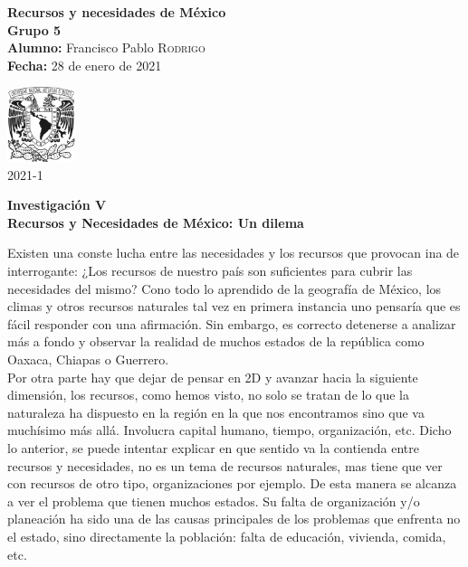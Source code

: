 \documentclass[12pt]{article}
\newcommand{\materia}{Recursos y necesidades de México}
\newcommand{\profesor}{Ing. Eduardo Alejandro Hernández González}
\newcommand{\grupo}{5}
\newcommand{\semestre}{2021-1}
\newcommand{\alumno}{Francisco Pablo \textsc{Rodrigo}}
\newcommand{\actividad}{Investigación V}
\newcommand{\titulo}{Recursos y Necesidades de México: Un dilema}
\newcommand{\fechaEntrega}{28 de enero de 2021}
\begin{document}
\begin{minipage}[t]{0.7\linewidth}
    \vspace{-1cm}
    \large{\textbf{\materia}}\\
    \large{\textbf{Grupo \grupo}}\\
    \large{\textbf{Alumno:} \alumno} \\
    \textbf{Fecha:} \fechaEntrega%
\end{minipage}\hfill
\begin{minipage}[t]{0.2\linewidth}
    \vspace{-1.2cm}
    \begin{flushright}
        \includegraphics[width=2cm]{unam.jpg}\\
        \large{\semestre}    
    \end{flushright}
\end{minipage}
\begin{center}
\large{
    \textbf{\actividad}\\
    \textbf{\titulo} \\ 
}
\end{center}

Existen una conste lucha entre las necesidades y los recursos que provocan ina
de interrogante: ¿Los recursos de nuestro país son suficientes para cubrir las
necesidades del mismo? Cono todo lo aprendido de la geografía de México, los
climas y otros recursos naturales tal vez en primera instancia uno pensaría que
es fácil responder con una afirmación. Sin embargo, es correcto detenerse a
analizar más a fondo y observar la realidad de muchos estados de la república
como Oaxaca, Chiapas o Guerrero.\\

Por otra parte hay que dejar de pensar en 2D y avanzar hacia la siguiente
dimensión, los recursos, como hemos visto, no solo se tratan de lo que la
naturaleza ha dispuesto en la región en la que nos encontramos sino que va
muchísimo más allá. Involucra capital humano, tiempo, organización, etc.
Dicho lo anterior, se puede intentar explicar en que sentido va la contienda
entre recursos y necesidades, no es un tema de recursos naturales, mas tiene que
ver con recursos de otro tipo, organizaciones por ejemplo. De esta manera se
alcanza a ver el problema que tienen muchos estados. Su falta de organización
y/o planeación ha sido una de las causas principales de los problemas que
enfrenta no el estado, sino directamente la población: falta de educación,
vivienda, comida, etc.\\
\end{document}
